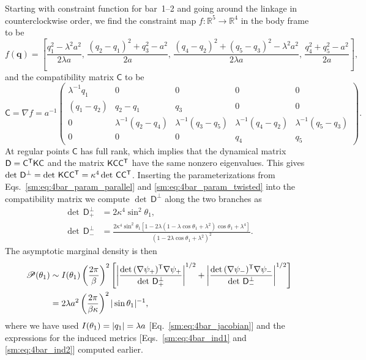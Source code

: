 Starting with constraint function for bar~1--2 and going around the linkage in counterclockwise order, we find the constraint map $f: \mathbb{R}^{5} \to \mathbb{R}^{4}$ in the body frame to be
%
\begin{equation}
  f(\bm{q}) = \left[\frac{q_1^2 - \lambda^2 a^2}{2\lambda a},\, \frac{(q_2 - q_1)^2 + q_3^2 - a^2}{2a},\, \frac{(q_4 - q_2)^2 + (q_5 - q_3)^2 - \lambda^2 a^2}{2\lambda a},\, \frac{q_4^2 + q_5^2 - a^2}{2a}\right],
\end{equation}
%
and the compatibility matrix $\mathsf{C}$ to be
%
\begin{equation}
  \mathsf{C} = \nabla f = a^{-1}\begin{pmatrix}
    \lambda^{-1}q_1 & 0 & 0 & 0 & 0 \\
    (q_1-q_2) & q_2-q_1 & q_3 & 0 & 0\\
    0 & \lambda^{-1}(q_2-q_4) & \lambda^{-1}(q_3-q_5) & \lambda^{-1}(q_4-q_2) & \lambda^{-1}(q_5-q_3)\\
  0 & 0 & 0 & q_4 & q_5
  \label{sm:eq:4bar_compatibility}
\end{pmatrix}.
\end{equation}
At regular points $\mathsf{C}$ has full rank, which implies that the dynamical matrix $\mathsf{D} = \mathsf{C}^\mathsf{T}\mathsf{K}\mathsf{C}$ and the matrix $\mathsf{K}\mathsf{C}\mathsf{C}^\mathsf{T}$ have the same nonzero eigenvalues.
This gives $\det\,\mathsf{D}^\perp = \det\,\mathsf{K}\mathsf{C}\mathsf{C}^\mathsf{T} = \kappa^4\det\,\mathsf{C}\mathsf{C}^\mathsf{T}$.
Inserting the parameterizations from Eqs.~\eqref{sm:eq:4bar_param_parallel} and \eqref{sm:eq:4bar_param_twisted} into the compatibility matrix we compute $\det\,\mathsf{D}^\perp$ along the two branches as
%
\begin{subequations}
\begin{align}
  \det\,\mathsf{D}^\perp_+ &= 2\kappa^4\sin^2\theta_1,\\
  \det\,\mathsf{D}^\perp_- &= \frac{2\kappa^4\sin^2{\theta_1}[1-2\lambda(1-\lambda\cos{\theta_1}+\lambda^2)\cos{\theta_1} + \lambda^4]}{(1-2\lambda\cos{\theta_1}+\lambda^2)^2}.
\end{align}
\end{subequations}
%
The asymptotic marginal density is then
%
\begin{equation}
  \begin{aligned}
    \mathscr{P}(\theta_1) &\sim I(\theta_1)\left(\frac{2\pi}{\beta}\right)^2\left[\left|\frac{\det\,(\nabla\psi_{+})^\mathsf{T}\nabla\psi_+}{\det\,\mathsf{D}_+^\perp}\right|^{1/2} + \left|\frac{\det\,(\nabla\psi_{-})^\mathsf{T}\nabla\psi_-}{\det\,\mathsf{D}_-^\perp}\right|^{1/2}\right]\\
                                           &= 2\lambda a^{2}\left(\frac{2\pi}{\beta\kappa}\right)^2|\sin{\theta_1}|^{-1},
  \end{aligned}
  \label{sm:eq:4bar_r}
\end{equation}
where we have used $I(\theta_{1}) = \lvert q_{1}\rvert = \lambda a$ [Eq.~\eqref{sm:eq:4bar_jacobian}] and the expressions for the induced metrics [Eqs.~\eqref{sm:eq:4bar_ind1} and \eqref{sm:eq:4bar_ind2}] computed earlier.

